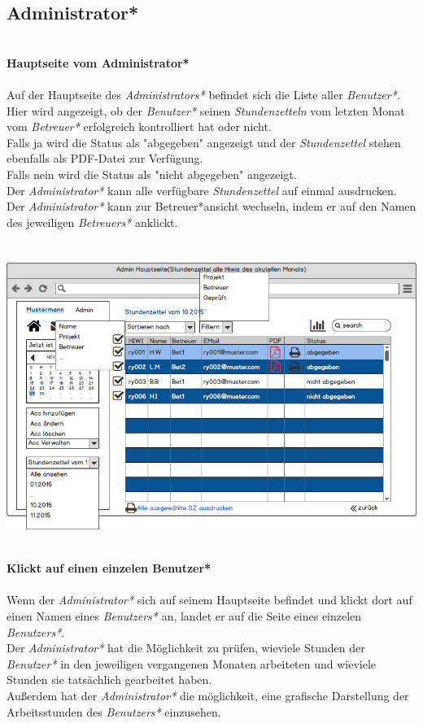 \subsection{Administrator*}
\textbf{\\Hauptseite vom Administrator*}\\
\\
Auf der Hauptseite des \emph{Administrators*} befindet sich die Liste aller \emph{Benutzer*}. Hier wird angezeigt, ob der \emph{Benutzer*} seinen \emph{Stundenzetteln} vom letzten Monat vom \emph{Betreuer*} erfolgreich kontrolliert hat oder nicht.\\
Falls ja wird die Status als "abgegeben" angezeigt und der \emph{Stundenzettel} stehen ebenfalls als PDF-Datei zur Verfügung.\\
Falls nein wird die Status als "nicht abgegeben" angezeigt.\\
Der \emph{Administrator*} kann alle verfügbare \emph{Stundenzettel} auf einmal ausdrucken.\\
Der \emph{Administrator*} kann zur Betreuer*ansicht wechseln, indem er auf den Namen des jeweiligen \emph{Betreuers*} anklickt.\\
\\
\\
\includegraphics[width=\linewidth]{UI/Admin/Hauptseite.png}

\newpage
\textbf{\\Klickt auf einen einzelen Benutzer*}\\
\\
Wenn der \emph{Administrator*} sich auf seinem Hauptseite befindet und klickt dort auf einen Namen eines \emph{Benutzers*} an, landet er auf die Seite eines einzelen \emph{Benutzers*}.\\
Der \emph{Administrator*} hat die Möglichkeit zu prüfen, wieviele Stunden  der \emph{Benutzer*} in den jeweiligen vergangenen Monaten arbeiteten und wieviele Stunden sie tatsächlich gearbeitet haben.\\
Außerdem hat der \emph{Administrator*} die möglichkeit, eine grafische Darstellung der Arbeitsstunden des \emph{Benutzers*} einzusehen.\\
\\
\\

